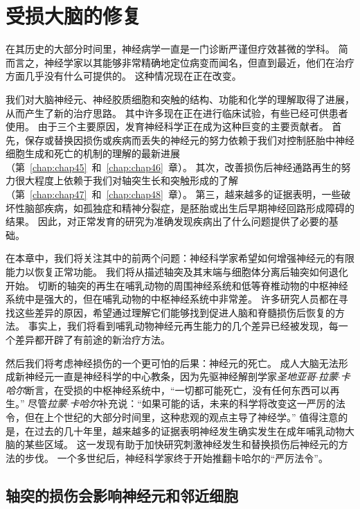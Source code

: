 \chapter{受损大脑的修复} \label{chap:chap50}

在其历史的大部分时间里，神经病学一直是一门诊断严谨但疗效甚微的学科。
简而言之，神经学家以其能够非常精确地定位病变而闻名，但直到最近，他们在治疗方面几乎没有什么可提供的。
这种情况现在正在改变。


我们对大脑神经元、神经胶质细胞和突触的结构、功能和化学的理解取得了进展，从而产生了新的治疗思路。
其中许多现在正在进行临床试验，有些已经可供患者使用。
由于三个主要原因，发育神经科学正在成为这种巨变的主要贡献者。
首先，保存或替换因损伤或疾病而丢失的神经元的努力依赖于我们对控制胚胎中神经细胞生成和死亡的机制的理解的最新进展（第~\ref{chap:chap45}~和~\ref{chap:chap46}~章）。
其次，改善损伤后神经通路再生的努力很大程度上依赖于我们对轴突生长和突触形成的了解（第~\ref{chap:chap47}~和~\ref{chap:chap48}~章）。
第三，越来越多的证据表明，一些破坏性脑部疾病，如孤独症和精神分裂症，是胚胎或出生后早期神经回路形成障碍的结果。
因此，对正常发育的研究为准确发现疾病出了什么问题提供了必要的基础。


在本章中，我们将关注其中的前两个问题：神经科学家希望如何增强神经元的有限能力以恢复正常功能。
我们将从描述轴突及其末端与细胞体分离后轴突如何退化开始。
切断的轴突的再生在哺乳动物的周围神经系统和低等脊椎动物的中枢神经系统中是强大的，但在哺乳动物的中枢神经系统中非常差。
许多研究人员都在寻找这些差异的原因，希望通过理解它们能够找到促进人脑和脊髓损伤后恢复的方法。
事实上，我们将看到哺乳动物神经元再生能力的几个差异已经被发现，每一个差异都开辟了有前途的新治疗方法。


然后我们将考虑神经损伤的一个更可怕的后果：神经元的死亡。
成人大脑无法形成新神经元一直是神经科学的中心教条，因为先驱神经解剖学家\textit{圣地亚哥$\cdot$拉蒙$\cdot$卡哈尔}断言，在受损的中枢神经系统中，“一切都可能死亡，没有任何东西可以再生。” 
尽管\textit{拉蒙$\cdot$卡哈尔}补充说：“如果可能的话，未来的科学将改变这一严厉的法令，但在上个世纪的大部分时间里，这种悲观的观点主导了神经学。”
值得注意的是，在过去的几十年里，越来越多的证据表明神经发生确实发生在成年哺乳动物大脑的某些区域。
这一发现有助于加快研究刺激神经发生和替换损伤后神经元的方法的步伐。
一个多世纪后，神经科学家终于开始推翻卡哈尔的“严厉法令”。



\section{轴突的损伤会影响神经元和邻近细胞}

